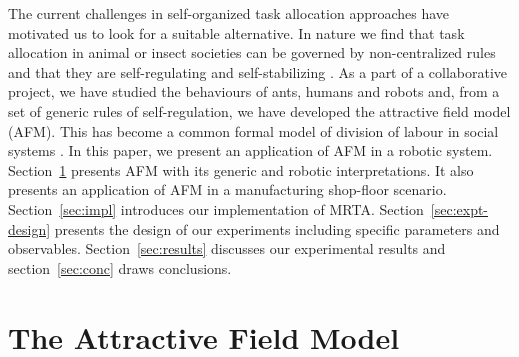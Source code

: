 \documentclass{llncs}
\begin{document}
The current challenges in self-organized task allocation approaches have motivated us to look for a suitable alternative.
In nature we find that task allocation in animal or insect societies can be governed by non-centralized rules and that they are self-regulating and self-stabilizing \cite{Bonabeau+1999}.  %
As a part of a collaborative project, we have studied the behaviours of ants, humans and robots and, from a set of generic rules of self-regulation, we have developed the attractive field model (AFM). This  has become  a common formal model of division of labour in social systems \cite{Elsa}. In this paper, we present an application of AFM in a robotic system.
Section~\ref{sec:model} presents AFM with its generic and robotic  interpretations. It also presents an application of AFM in a manufacturing shop-floor scenario. Section~\ref{sec:impl} introduces our implementation of MRTA.
Section~\ref{sec:expt-design} presents the design of our experiments including specific parameters and observables.
Section~\ref{sec:results} discusses our experimental results and section~\ref{sec:conc} draws conclusions.
\section{The Attractive Field Model}
\label{sec:model}
\end{document}

